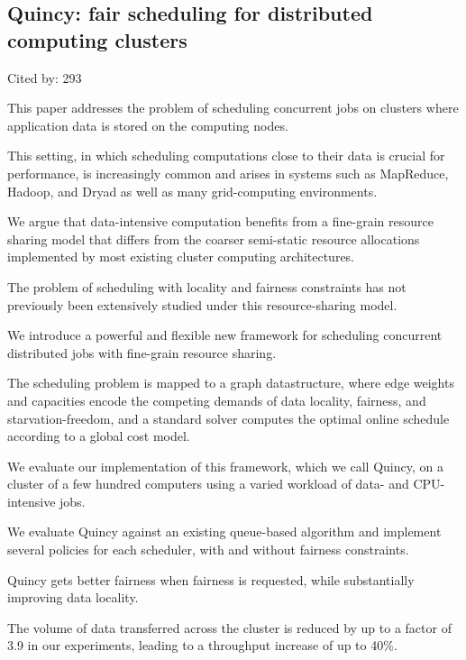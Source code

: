\documentclass[a4paper,11pt]{article}
\begin{document}
\subsection*{Quincy: fair scheduling for distributed computing clusters}
{\color{cyan} {\color{magenta} Cited by: 293}

This paper addresses the problem of 
scheduling concurrent jobs on clusters where application data is stored on the computing nodes.

This setting, in which 
scheduling computations close to their data is crucial for performance, 
is increasingly common and arises in systems such as 
MapReduce, Hadoop, and Dryad as well as many grid-computing environments. 

We argue that 
data-intensive computation 
benefits from a fine-grain resource sharing model that 
differs from the coarser semi-static resource allocations 
implemented by most existing cluster computing architectures. 

The problem of
scheduling with locality and fairness constraints has 
not previously been extensively studied 
under this resource-sharing model.

We introduce 
a powerful and flexible new framework 
for scheduling concurrent distributed jobs with fine-grain resource sharing.

The scheduling problem is mapped to a 
graph datastructure, where 
edge weights and capacities encode the competing demands of 
data locality, fairness, and starvation-freedom, and 
a standard solver computes the optimal online schedule according to a global cost model. 

We evaluate 
our implementation of this framework, which we call 
{\color{black} Quincy\cite{quincy}}, 
on a cluster of a few hundred computers using a varied workload of data- and CPU-intensive jobs. 

We 
evaluate Quincy against an existing queue-based algorithm and 
implement several policies for each scheduler, with and without fairness constraints.

Quincy gets better fairness when fairness is requested,
while substantially improving data locality. 

The volume of data transferred across the cluster is reduced by up to a factor of 3.9 
in our experiments, 
leading to a throughput increase of up to 40\%.

}
\end{document}
